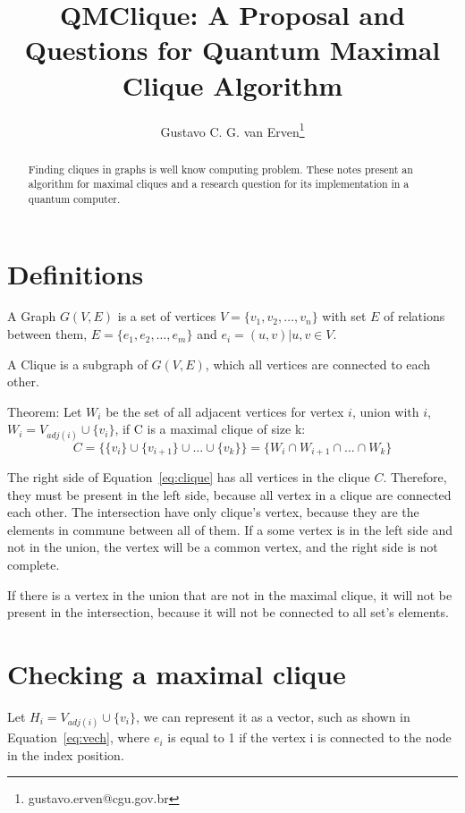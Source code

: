 \documentclass[a4paper,12pt]{article}
\begin{document}
\title{QMClique: A Proposal and Questions for Quantum Maximal Clique Algorithm}
\author{Gustavo C. G. van Erven\footnote{gustavo.erven@cgu.gov.br}}
\maketitle

\begin{abstract}
	Finding cliques in graphs is well know computing problem. These notes present an algorithm for maximal cliques and a research question for its implementation in a quantum computer. 
\end{abstract}

\section{Definitions}

A Graph $G(V,E)$ is a set of vertices $V = \{v_1,v_2,\dots,v_n\}$ with set $E$ of relations between them, $E = \{e_1,e_2,\dots,e_m\}$ and $e_i = (u,v) | u,v \in V$.

A Clique is a subgraph of $G(V,E)$, which all vertices are connected to each other.

Theorem: Let $W_i$ be the set of all adjacent vertices for vertex $i$, union with $i$, $W_i = V_{adj(i)} \cup \{v_i\}$, if C is a maximal clique of size k:
\begin{equation}\label{eq:clique}
C = \{\{v_i\} \cup \{v_{i+1}\} \cup \dots \cup \{v_k\}\} = \{W_i \cap W_{i+1} \cap \dots \cap W_{k}\}
\end{equation}

The right side of Equation~\ref{eq:clique} has all vertices in the clique $C$. Therefore, they must be present in the left side, because all vertex in a clique are connected each other. The intersection have only clique's vertex, because they are the elements in commune between all of them. If a some vertex is in the left side and not in the union, the vertex will be a common vertex, and the right side is not complete. 

If there is a vertex in the union that are not in the maximal clique, it will not be present in the intersection, because it will not be connected to all set's elements.

\section{Checking a maximal clique}

Let $H_i = V_{adj(i)} \cup \{v_i\}$, we can represent it as a vector, such as shown in Equation~\ref{eq:vech}, where $e_i$ is equal to 1 if the vertex i is connected to the node in the index position.
\end{document}

